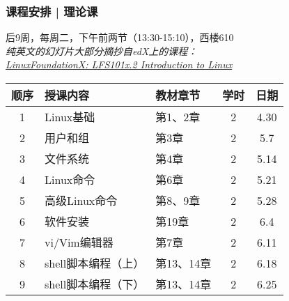 \begin{frame}
  \frametitle{课程安排 | 理论课}
  \begin{center}
  \alert{后9周，每周二，下午前两节（13:30-15:10），西楼610}\\
  \vspace{0.2cm}
  {\footnotesize
  \textit{纯英文的幻灯片大部分摘抄自edX上的课程：\\ \href{https://www.edx.org/course/introduction-linux-linuxfoundationx-lfs101x-2}{LinuxFoundationX: LFS101x.2 Introduction to Linux}}
  }
  \end{center}
  \vspace{-0.5cm}
  \begin{table}
    \centering
    \begin{tabular}{cllcc}
      \hline
      \rowcolor{blue!50}顺序 & 授课内容 & 教材章节 & 学时 & 日期\\
      \hline
      1 & Linux基础 & 第1、2章 & 2 & 4.30\\
      2 & 用户和组 & 第3章 & 2 & 5.7\\
      3 & 文件系统 & 第4章 & 2 & 5.14\\
      4 & Linux命令 & 第6章 & 2 & 5.21\\
      5 & 高级Linux命令 & 第8、9章 & 2 & 5.28\\
      6 & 软件安装 & 第19章 & 2 & 6.4\\
      7 & vi/Vim编辑器 & 第7章 & 2 & 6.11\\
      8 & shell脚本编程（上） & 第13、14章 & 2 & 6.18\\
      9 & shell脚本编程（下） & 第13、14章 & 2 & 6.25\\
      \hline
    \end{tabular}
  \end{table}
\end{frame}

